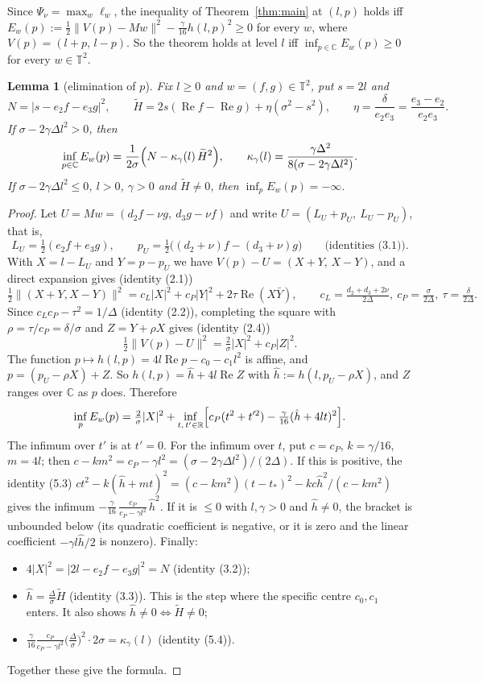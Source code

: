 \documentclass[11pt]{article}
\newtheorem{lemma}{Lemma}
\theoremstyle{remark}
\renewcommand{\Re}{\operatorname{Re}}
\newcommand{\T}{\mathbb{T}}
\newcommand{\C}{\mathbb{C}}
\begin{document}
Since $\Psi_\nu=\max_w\ell_w$, the inequality of Theorem~\ref{thm:main} at $(l,p)$ holds iff
$E_w(p):=\frac12\|V(p)-Mw\|^2-\frac{\gamma}{16}h(l,p)^2\ge0$ for every $w$, where $V(p)=(l+p,\,l-p)$. So the theorem holds at level
$l$ iff $\inf_{p\in\C}E_w(p)\ge0$ for every $w\in\T^2$.

\begin{lemma}[elimination of $p$]\label{lem:elim}
Fix $l\ge0$ and $w=(f,g)\in\T^2$, put $s=2l$ and
\[
N=|s-e_2f-e_3g|^2,\qquad \widetilde H=2s(\Re f-\Re g)+\eta(\sigma^2-s^2),\qquad \eta=\frac{\delta}{e_2e_3}=\frac{e_3-e_2}{e_2e_3}.
\]
If $\sigma-2\gamma\Delta l^2>0$, then
\[
\inf_{p\in\C}E_w(p)=\frac{1}{2\sigma}\Bigl(N-\kappa_\gamma(l)\,\widetilde H^2\Bigr),\qquad
\kappa_\gamma(l)=\frac{\gamma\Delta^2}{8(\sigma-2\gamma\Delta l^2)} .
\]
If $\sigma-2\gamma\Delta l^2\le0$, $l>0$, $\gamma>0$ and $\widetilde H\ne0$, then $\inf_pE_w(p)=-\infty$.
\end{lemma}
\begin{proof}
Let $U=Mw=(d_2f-\nu g,\ d_3g-\nu f)$ and write $U=(L_U+p_U,\ L_U-p_U)$, that is,
\[
L_U=\tfrac12(e_2f+e_3g),\qquad p_U=\tfrac12\bigl((d_2+\nu)f-(d_3+\nu)g\bigr)\qquad\text{(identities (3.1))}.
\]
With $X=l-L_U$ and $Y=p-p_U$ we have $V(p)-U=(X+Y,\,X-Y)$, and a direct expansion gives (identity (2.1))
\[
\tfrac12\|(X+Y,X-Y)\|^2=c_L|X|^2+c_P|Y|^2+2\tau\Re(X\bar Y),\qquad
c_L=\tfrac{d_2+d_3+2\nu}{2\Delta},\ c_P=\tfrac{\sigma}{2\Delta},\ \tau=\tfrac{\delta}{2\Delta}.
\]
Since $c_Lc_P-\tau^2=1/\Delta$ (identity (2.2)), completing the square with $\rho=\tau/c_P=\delta/\sigma$ and $Z=Y+\rho X$ gives
(identity (2.4))
\[
\tfrac12\|V(p)-U\|^2=\tfrac{2}{\sigma}|X|^2+c_P|Z|^2 .
\]
The function $p\mapsto h(l,p)=4l\Re p-c_0-c_1l^2$ is affine, and $p=(p_U-\rho X)+Z$. So $h(l,p)=\hat h+4l\Re Z$ with
$\hat h:=h(l,p_U-\rho X)$, and $Z$ ranges over $\C$ as $p$ does. Therefore
\[
\inf_pE_w(p)=\tfrac2\sigma|X|^2+\inf_{t,\,t'\in\mathbb R}\Bigl[c_P(t^2+t'^2)-\tfrac{\gamma}{16}(\hat h+4lt)^2\Bigr].
\]
The infimum over $t'$ is at $t'=0$. For the infimum over $t$, put $c=c_P$, $k=\gamma/16$, $m=4l$; then $c-km^2=c_P-\gamma l^2=
(\sigma-2\gamma\Delta l^2)/(2\Delta)$. If this is positive, the identity (5.3)
$ct^2-k(\hat h+mt)^2=(c-km^2)(t-t_*)^2-kc\hat h^2/(c-km^2)$ gives the infimum $-\frac{\gamma}{16}\,\frac{c_P}{c_P-\gamma l^2}\,\hat h^2$.
If it is $\le0$ with $l,\gamma>0$ and $\hat h\ne0$, the bracket is unbounded below (its quadratic coefficient is negative, or it is
zero and the linear coefficient $-\gamma l\hat h/2$ is nonzero). Finally:
\begin{itemize}
\item $4|X|^2=|2l-e_2f-e_3g|^2=N$ (identity (3.2));
\item $\hat h=\frac{\Delta}{\sigma}\widetilde H$ (identity (3.3)). This is the step where the specific centre $c_0,c_1$ enters. It
also shows $\hat h\ne0\iff\widetilde H\ne0$;
\item $\frac{\gamma}{16}\frac{c_P}{c_P-\gamma l^2}\bigl(\frac\Delta\sigma\bigr)^2\cdot2\sigma=\kappa_\gamma(l)$ (identity (5.4)).
\end{itemize}
Together these give the formula.
\end{proof}
\end{document}
